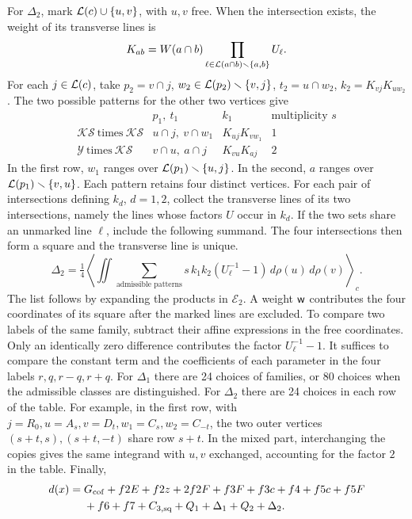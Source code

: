 For \(\Delta_2\), mark \(\mathcal L(c)\cup\{u,v\}\), with \(u,v\) free. When the intersection exists, the
weight of its transverse lines is \[
 K_{ab}=W(a\cap b)\prod_{\ell\in \mathcal L(a\cap b)\smallsetminus\{a,b\}}U_\ell .
\] For each \(j\in \mathcal L(c)\), take \(p_2=v\cap j\), \(w_2\in \mathcal L(p_2)\smallsetminus\{v,j\}\),
\(t_2=u\cap w_2\), \(k_2=K_{vj}K_{uw_2}\). The two possible patterns for the other two vertices give \[
\begin{array}{c|c|c|c}
 &p_1,\ t_1 &k_1&\text{multiplicity }s\\ \hline
 \mathcal K\mathcal S\ \text{times}\ \mathcal K\mathcal S&
 u\cap j,\ v\cap w_1 & K_{uj}K_{vw_1}&1\\
 \mathcal Y\ \text{times}\ \mathcal K\mathcal S&
 v\cap u,\ a\cap j & K_{vu}K_{aj}&2
\end{array}
\] In the first row, \(w_1\) ranges over \(\mathcal L(p_1)\smallsetminus\{u,j\}\). In the second, \(a\) ranges
over \(\mathcal L(p_1)\smallsetminus\{v,u\}\). Each pattern retains four distinct vertices. For each pair of
intersections defining \(k_d\), \(d=1,2\), collect the transverse lines of its two intersections, namely
the lines whose factors \(U\) occur in \(k_d\). If the two sets share an unmarked line \(\ell\), include
the following summand. The four intersections then form a square and the transverse line is unique. \[
 \Delta_2=\tfrac14\left\langle\iint\sum_{\text{admissible patterns}}
          s\,k_1k_2(U_\ell^{-1}-1)\,d\rho(u)\,d\rho(v)\right\rangle_c .
\] The list follows by expanding the products in \(\mathcal E_2\). A weight \(\mathsf w\) contributes
the four coordinates of its square after the marked lines are excluded. To compare two labels of the same
family, subtract their affine expressions in the free coordinates. Only an identically zero difference
contributes the factor \(U_\ell^{-1}-1\). It suffices to compare the constant term and the coefficients
of each parameter in the four labels \(r,q,r-q,r+q\). For \(\Delta_1\) there are 24 choices of families,
or 80 choices when the admissible classes are distinguished. For \(\Delta_2\) there are 24 choices in
each row of the table. For example, in the first row, with \(j=R_0,u=A_s,v=D_t,w_1=C_s,w_2=C_{-t}\), the
two outer vertices \((s+t,s),(s+t,-t)\) share row \(s+t\). In the mixed part, interchanging the copies
gives the same integrand with \(u,v\) exchanged, accounting for the factor \(2\) in the table. Finally,
\begin{align}
 d(x)={}&G_{\rm cof}+f2E+f2z+2f2F+f3F+f3c+f4+f5c+f5F\notag\\
        &+f6+f7+C_{3,\rm sq}+Q_1+\Delta_1+Q_2+\Delta_2 .\label{eq:d-suma}
\end{align}
